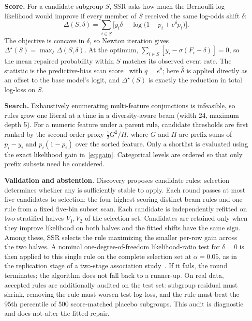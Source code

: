 \documentclass[conference]{IEEEtran}
\begin{document}
\textbf{Score.} For a candidate subgroup $S$, SSR asks how much the Bernoulli
log-likelihood would improve if every member of $S$ received the same log-odds shift $\delta$:
\begin{equation}\label{eq:gain}
\Delta(S,\delta) = \sum_{i\in S}\Big[y_i\delta - \log\big(1-p_i+e^{\delta}p_i\big)\Big].
\end{equation}
The objective is concave in $\delta$, so Newton iteration gives
$\Delta^\star(S)=\max_\delta\Delta(S,\delta)$. At the optimum,
$\sum_{i\in S}[y_i-\sigma(F_i+\delta)]=0$, so the mean repaired probability within $S$ matches
its observed event rate. The statistic is the predictive-bias scan score~\cite{zhang2016bias} with $q=e^{\delta}$; here
$\hat\delta$ is applied directly as an offset to the base model's logit, and $\Delta^\star(S)$ is exactly
the reduction in total log-loss on $S$.

\textbf{Search.} Exhaustively enumerating multi-feature conjunctions is infeasible, so rules grow
one literal at a time in a diversity-aware beam (width 24, maximum depth 5). For a numeric feature
under a parent rule, candidate thresholds are first ranked by the second-order proxy
$\tfrac12 G^2/H$, where $G$ and $H$ are prefix sums of $p_i-y_i$ and $p_i(1-p_i)$ over the sorted
feature. Only a shortlist is evaluated using the exact likelihood gain in~\eqref{eq:gain}.
Categorical levels are ordered so that only prefix subsets need be considered.

\textbf{Validation and abstention.} Discovery proposes candidate rules; selection determines
whether any is sufficiently stable to apply. Each round passes at most five candidates to
selection: the four highest-scoring distinct beam rules and one rule from a fixed five-bin subset
scan. Each candidate is independently refitted on two
stratified halves $V_1,V_2$ of the selection set. Candidates are retained only when they improve
likelihood on both halves and the fitted shifts have the same sign. Among these, SSR selects
the rule maximizing the smaller per-row gain across the two halves. A nominal one-degree-of-freedom
likelihood-ratio test for $\delta=0$ is then applied to this single rule on the complete selection
set at $\alpha=0.05$, as in the replication stage of a two-stage association study~\cite{kraft2009replication}. If it fails, the round terminates; the algorithm does not fall back to a
runner-up. On real data, accepted rules are additionally audited on the test set: subgroup residual
must shrink, removing the rule must worsen test log-loss, and the rule must beat the 95th percentile
of 500 score-matched placebo subgroups. This audit is diagnostic and does not alter the fitted
repair.
\end{document}
